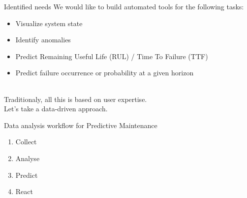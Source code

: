 \documentclass{beamer}
\begin{document}
\begin{frame}{Identified needs}
We would like to build automated tools for the following tasks:
\begin{itemize}
\item Visualize system state
\item Identify anomalies
\item Predict Remaining Useful Life (RUL) / Time To Failure (TTF)
\item Predict failure occurrence or probability at a given horizon
\end{itemize}
~\\
Traditionaly, all this is based on user expertise.\\
Let's take a data-driven approach.
\end{frame}

\begin{frame}{Data analysis workflow for Predictive Maintenance}
\begin{enumerate}
\item<1-> Collect
\item<2-> Analyse
\item<3-> Predict
\item<4-> React
\end{enumerate}
\begin{overlayarea}{10cm}{4cm}
\begin{block}{}
\end{block}
\end{overlayarea}
\end{frame}
\end{document}
